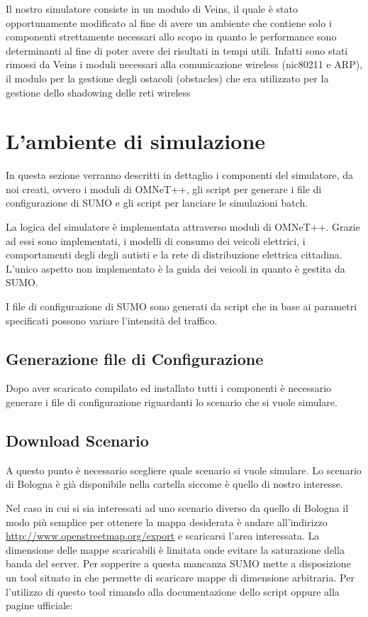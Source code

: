 Il nostro simulatore consiste in un modulo di Veins, il quale è stato opportunamente modificato al fine di avere un ambiente che contiene solo i componenti strettamente necessari allo scopo in quanto le performance sono determinanti al fine di poter avere dei risultati in tempi utili. Infatti sono stati rimossi da Veins i moduli necessari alla comunicazione wireless (nic80211 e ARP), il modulo per la gestione degli ostacoli (obstacles) che era utilizzato per la gestione dello shadowing delle reti wireless


\section{L'ambiente di simulazione}

In questa sezione verranno descritti in dettaglio i componenti del simulatore, da noi creati, ovvero i moduli di OMNeT++, gli script per generare i file di configurazione di SUMO e gli script per lanciare le simulazioni batch.

La logica del simulatore è implementata attraverso moduli di OMNeT++. Grazie ad essi sono implementati, i modelli di consumo dei veicoli elettrici, i comportamenti degli degli autisti e la rete di distribuzione elettrica cittadina. L'unico aspetto non implementato è la guida dei veicoli in quanto è gestita da SUMO.

I file di configurazione di SUMO sono generati da script che in base ai parametri specificati possono variare l'intensità del traffico.



\subsection{Generazione file di Configurazione}

Dopo aver scaricato compilato ed installato tutti i componenti è necessario generare i file di configurazione riguardanti lo scenario che si vuole simulare. 

\subsection{Download Scenario}

A questo punto è necessario scegliere quale scenario si vuole simulare. Lo scenario di Bologna è già disponibile nella cartella  siccome è quello di nostro interesse.

Nel caso in cui si sia interessati ad uno scenario diverso da quello di Bologna il modo più semplice per ottenere la mappa desiderata è andare all'indirizzo \url{http://www.openstreetmap.org/export} e scaricarsi l'area interessata. La dimensione delle mappe scaricabili è limitata onde evitare la saturazione della banda del server. Per sopperire a questa mancanza SUMO mette a disposizione un tool situato in  che permette di scaricare mappe di dimensione arbitraria. Per l'utilizzo di questo tool rimando alla documentazione dello script oppure alla pagine ufficiale:

